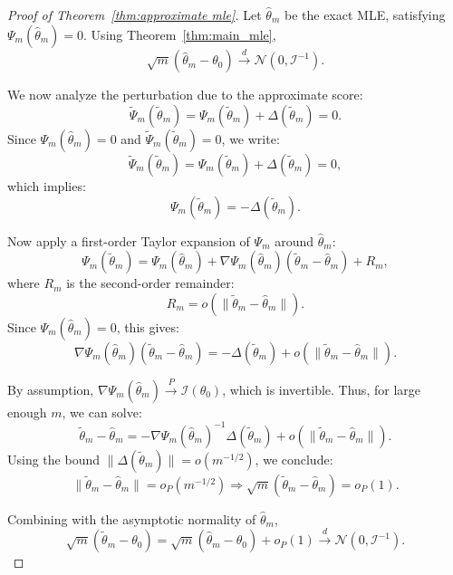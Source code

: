\documentclass{article}
\begin{document}
\begin{proof}[Proof of Theorem~\ref{thm:approximate mle}]
Let \(\hat\theta_m\) be the exact MLE, satisfying \(\Psi_m(\hat\theta_m) = 0\). Using Theorem~\ref{thm:main_mle},
\[
\sqrt{m}(\hat\theta_m - \theta_0) \xrightarrow{d} \mathcal{N}(0, \mathcal{I}^{-1}).
\]

We now analyze the perturbation due to the approximate score:
\[
\widetilde{\Psi}_m(\tilde\theta_m) = \Psi_m(\tilde\theta_m) + \Delta(\tilde\theta_m) = 0.
\]Since \(\Psi_m(\hat\theta_m) = 0\) and \(\widetilde{\Psi}_m(\tilde\theta_m) = 0\), we write:
\[
\widetilde{\Psi}_m(\tilde\theta_m) = \Psi_m(\tilde\theta_m) + \Delta(\tilde\theta_m) = 0,
\]
which implies:
\[
\Psi_m(\tilde\theta_m) = -\Delta(\tilde\theta_m).
\]

Now apply a first-order Taylor expansion of \(\Psi_m\) around \(\hat\theta_m\):
\[
\Psi_m(\tilde\theta_m) = \Psi_m(\hat\theta_m) + \nabla \Psi_m(\hat\theta_m)(\tilde\theta_m - \hat\theta_m) + R_m,
\]
where \(R_m\) is the second-order remainder:
\[
R_m = o(\|\tilde\theta_m - \hat\theta_m\|).
\]
Since \(\Psi_m(\hat\theta_m) = 0\), this gives:
\[
\nabla \Psi_m(\hat\theta_m)(\tilde\theta_m - \hat\theta_m) = -\Delta(\tilde\theta_m) + o(\|\tilde\theta_m - \hat\theta_m\|).
\]

By assumption, \(\nabla \Psi_m(\hat\theta_m) \xrightarrow{P} \mathcal{I}(\theta_0)\), which is invertible. Thus, for large enough \(m\), we can solve:
\[
\tilde\theta_m - \hat\theta_m = -\nabla \Psi_m(\hat\theta_m)^{-1}\Delta(\tilde\theta_m) + o(\|\tilde\theta_m - \hat\theta_m\|).
\]
Using the bound \(\|\Delta(\tilde\theta_m)\| = o(m^{-1/2})\), we conclude:
\[
\|\tilde\theta_m - \hat\theta_m\| = o_P(m^{-1/2}) \Rightarrow \sqrt{m}(\tilde\theta_m - \hat\theta_m) = o_P(1).
\]

Combining with the asymptotic normality of \(\hat\theta_m\),
\[
\sqrt{m}(\tilde\theta_m - \theta_0) = \sqrt{m}(\hat\theta_m - \theta_0) + o_P(1) \xrightarrow{d} \mathcal{N}(0, \mathcal{I}^{-1}).
\]
\end{proof}




\end{document}
